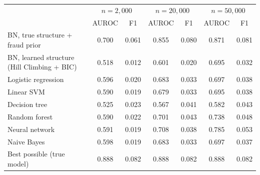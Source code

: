 \begin{tabular}{lcccccc}\toprule
 & \multicolumn{2}{c}{$n=2,000$} & \multicolumn{2}{c}{$n=20,000$} & \multicolumn{2}{c}{$n=50,000$}\\
 & AUROC & F1 & AUROC & F1 & AUROC & F1\\\midrule
BN, true structure + fraud prior & 0.700 & 0.061 & 0.855 & 0.080 & 0.871 & 0.081\\
BN, learned structure (Hill Climbing + BIC) & 0.518 & 0.012 & 0.601 & 0.020 & 0.695 & 0.032\\
\midrule
Logistic regression & 0.596 & 0.020 & 0.683 & 0.033 & 0.697 & 0.038\\
Linear SVM & 0.590 & 0.019 & 0.679 & 0.033 & 0.695 & 0.038\\
Decision tree & 0.525 & 0.023 & 0.567 & 0.041 & 0.582 & 0.043\\
Random forest & 0.590 & 0.022 & 0.701 & 0.043 & 0.738 & 0.048\\
Neural network & 0.591 & 0.019 & 0.708 & 0.038 & 0.785 & 0.053\\
Naive Bayes & 0.598 & 0.019 & 0.683 & 0.033 & 0.697 & 0.037\\
\midrule Best possible (true model) & 0.888 & 0.082 & 0.888 & 0.082 & 0.888 & 0.082\\
\bottomrule\end{tabular}